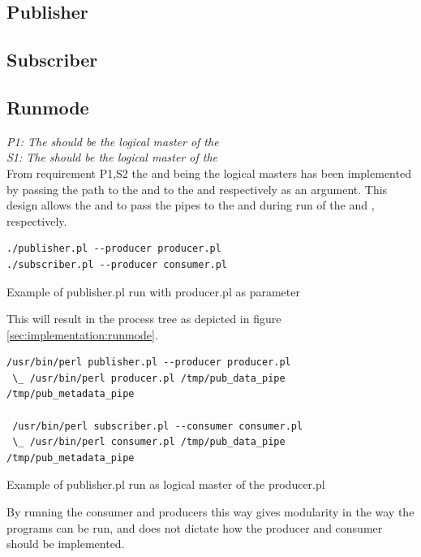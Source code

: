 \subsection{Publisher}
\subsection{Subscriber}
\subsection{Runmode}
\textit{P1: The \pub{} should be the logical master of the \pro{}}\\
\textit{S1: The \sub{} should be the logical master of the \pro{}}\\

From requirement P1,S2 the \pub{} and \sub{} being the logical masters has been implemented by passing the path to the \con{} and \pro{} to the \sub{} and \pro{} respectively as an argument. This design allows the \pub{} and \sub{} to pass the pipes to the \pro{} and \con{} during run of the \con and \pro, respectively.

\begin{listing}[H] 
\begin{verbatim}
./publisher.pl --producer producer.pl
./subscriber.pl --producer consumer.pl
\end{verbatim}
\caption{Example of publisher.pl run with producer.pl as parameter}
\label{code:critical_section_c}
\end{listing}

This will result in the process tree as depicted in figure \ref{sec:implementation:runmode}.

\begin{listing}[H] 
\begin{verbatim}
/usr/bin/perl publisher.pl --producer producer.pl
 \_ /usr/bin/perl producer.pl /tmp/pub_data_pipe /tmp/pub_metadata_pipe
 
 /usr/bin/perl subscriber.pl --consumer consumer.pl
 \_ /usr/bin/perl consumer.pl /tmp/pub_data_pipe /tmp/pub_metadata_pipe
\end{verbatim}
\caption{Example of publisher.pl run as logical master of the producer.pl}
\label{sec:implementation:runmode}
\end{listing}

By running the consumer and producers this way gives modularity in the way the programs can be run, and does not dictate how the producer and consumer should be implemented.


